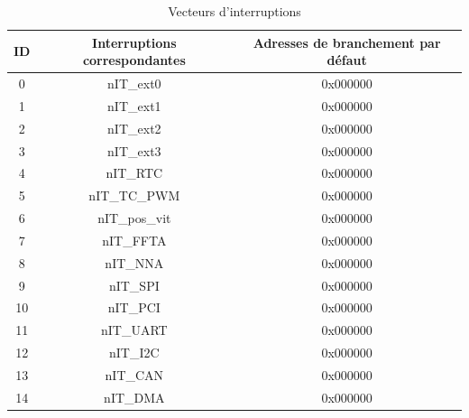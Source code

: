 \begin{table}[H]
	\centering
	\begin{tabular}{|c|c|c|}
		\hline
		ID & Interruptions correspondantes & Adresses de branchement par défaut\\
		\hline
		0 & nIT\_ext0 & 0x000000\\
		\hline
		1 & nIT\_ext1 & 0x000000\\
		\hline
		2 & nIT\_ext2 & 0x000000\\
		\hline
		3 & nIT\_ext3 & 0x000000\\
		\hline
		4 & nIT\_RTC & 0x000000\\
		\hline
		5 & nIT\_TC\_PWM & 0x000000\\
		\hline
		6 & nIT\_pos\_vit & 0x000000\\
		\hline
		7 & nIT\_FFTA & 0x000000\\
		\hline
		8 & nIT\_NNA & 0x000000\\
		\hline
		9 & nIT\_SPI & 0x000000\\
		\hline
		10 & nIT\_PCI & 0x000000\\
		\hline
		11 & nIT\_UART & 0x000000\\
		\hline
		12 & nIT\_I2C & 0x000000\\
		\hline
		13 & nIT\_CAN & 0x000000\\
		\hline
		14 & nIT\_DMA & 0x000000\\
		\hline
	\end{tabular}
	\caption{Vecteurs d'interruptions}
	\label{tab:vec_int}
\end{table}



